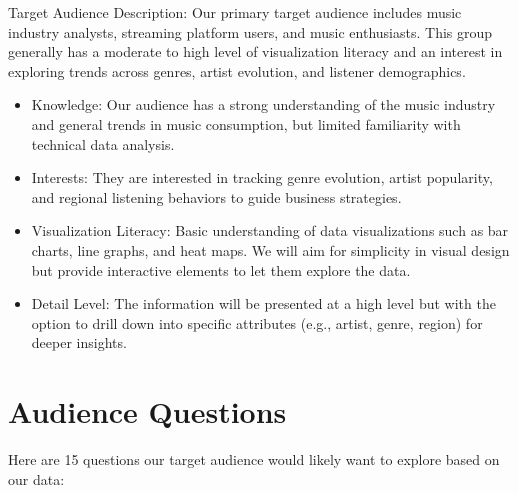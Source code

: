 \documentclass[12pt]{article}
\begin{document}
Target Audience Description: Our primary target audience includes music industry analysts, streaming platform users, and music enthusiasts. This group generally has a moderate to high level of visualization literacy and an interest in exploring trends across genres, artist evolution, and listener demographics.

\begin{itemize}
  \item Knowledge: Our audience has a strong understanding of the music industry and general trends in music consumption, but limited familiarity with technical data analysis.
  \item Interests: They are interested in tracking genre evolution, artist popularity, and regional listening behaviors to guide business strategies.
  \item Visualization Literacy: Basic understanding of data visualizations such as bar charts, line graphs, and heat maps. We will aim for simplicity in visual design but provide interactive elements to let them explore the data.
  \item Detail Level: The information will be presented at a high level but with the option to drill down into specific attributes (e.g., artist, genre, region) for deeper insights.
\end{itemize}

\section*{Audience Questions}
Here are 15 questions our target audience would likely want to explore based on our data:
\end{document}
